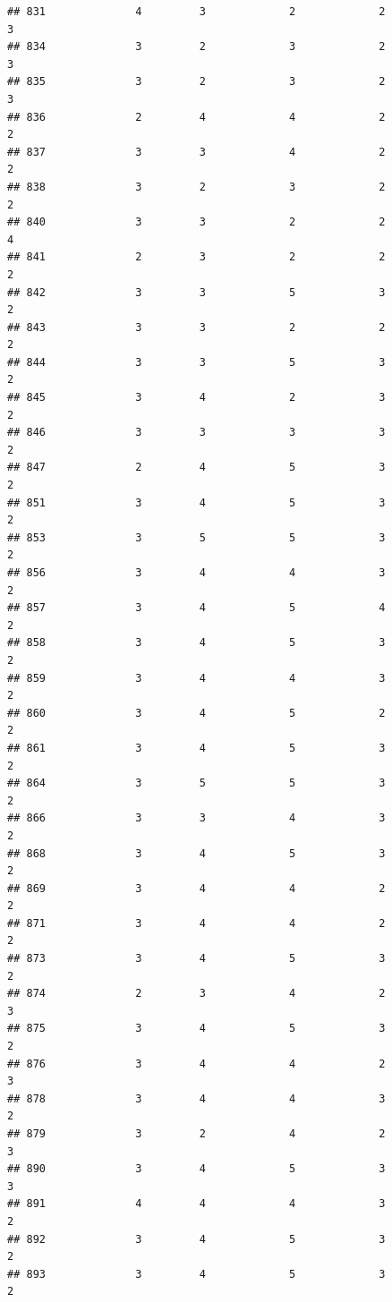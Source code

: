 \documentclass[
]{article}
\begin{document}
\begin{verbatim}
## 831              4         3             2             2           3
## 834              3         2             3             2           3
## 835              3         2             3             2           3
## 836              2         4             4             2           2
## 837              3         3             4             2           2
## 838              3         2             3             2           2
## 840              3         3             2             2           4
## 841              2         3             2             2           2
## 842              3         3             5             3           2
## 843              3         3             2             2           2
## 844              3         3             5             3           2
## 845              3         4             2             3           2
## 846              3         3             3             3           2
## 847              2         4             5             3           2
## 851              3         4             5             3           2
## 853              3         5             5             3           2
## 856              3         4             4             3           2
## 857              3         4             5             4           2
## 858              3         4             5             3           2
## 859              3         4             4             3           2
## 860              3         4             5             2           2
## 861              3         4             5             3           2
## 864              3         5             5             3           2
## 866              3         3             4             3           2
## 868              3         4             5             3           2
## 869              3         4             4             2           2
## 871              3         4             4             2           2
## 873              3         4             5             3           2
## 874              2         3             4             2           3
## 875              3         4             5             3           2
## 876              3         4             4             2           3
## 878              3         4             4             3           2
## 879              3         2             4             2           3
## 890              3         4             5             3           3
## 891              4         4             4             3           2
## 892              3         4             5             3           2
## 893              3         4             5             3           2

\end{verbatim}
\end{document}
